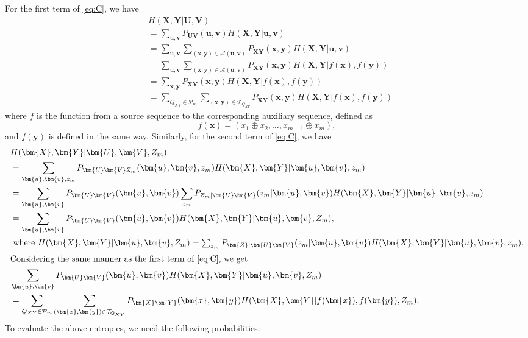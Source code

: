 \documentclass[journal,onecolumn]{IEEEtran}
\theoremstyle{definition}
\theoremstyle{remark}
\newcommand{\xm}{\bm{x}}
\newcommand{\ym}{\bm{y}}
\newcommand{\um}{\bm{u}}
\newcommand{\vm}{\bm{v}}
\newcommand{\Xm}{\bm{X}}
\newcommand{\Ym}{\bm{Y}}
\newcommand{\Um}{\bm{U}}
\newcommand{\Vm}{\bm{V}}
\newcommand{\Zm}{\bm{Z}}
\begin{document}
    For the first term of \eqref{eq:C}, we have
    \begin{align*}
        &H(\Xm,\Ym|\Um,\Vm)\\
        &= \sum_{ \um , \vm } P_{\Um\Vm}( \um , \vm ) H(\Xm,\Ym| \um , \vm )\\
        &= \sum_{ \um , \vm } \sum_{( \xm , \ym )\in \mathcal{A}( \um , \vm )} P_{\Xm\Ym}( \xm , \ym ) H(\Xm,\Ym| \um , \vm ) \\
        &= \sum_{ \um , \vm } \sum_{( \xm , \ym )\in \mathcal{A}( \um , \vm )} P_{\Xm\Ym}( \xm , \ym ) H(\Xm,\Ym| f ( \xm ), f ( \ym ))\\
        &= \sum_{ \xm , \ym }P_{\Xm\Ym}( \xm , \ym ) H(\Xm,\Ym| f ( \xm ), f ( \ym ))\\
        &= \sum_{Q_{XY}\in \mathcal{P}_m} \sum_{( \xm , \ym )\in \mathcal{T}_{Q_{XY}} } P_{\Xm\Ym}( \xm , \ym )H(\Xm,\Ym| f ( \xm ), f ( \ym ))
    \end{align*}
    where $f$ is the function from a source sequence to the corresponding auxiliary sequence, defined as
    \begin{equation*}
        f(\xm)
        =
        (x_1\oplus x_2,\ldots,x_{m-1}\oplus x_m),
    \end{equation*}
    and \(f(\ym)\) is defined in the same way.
    Similarly, for the second term of \eqref{eq:C}, we have
    \begin{align*}
        &H(\Xm,\Ym|\Um,\Vm,Z_m)\\
        &= \sum_{ \um , \vm ,z_m} P_{\Um\Vm Z_m}( \um , \vm ,z_m) H(\Xm,\Ym| \um , \vm ,z_m)\\
        &= \sum_{ \um , \vm } P_{\Um\Vm}( \um , \vm ) \sum_{z_m} P_{Z_m|\Um\Vm}(z_m| \um , \vm ) H(\Xm,\Ym| \um , \vm ,z_m)\\
        &= \sum_{ \um , \vm } P_{\Um\Vm}( \um , \vm ) H(\Xm,\Ym| \um , \vm ,Z_m),\\
        \intertext{    where $H(\Xm,\Ym| \um , \vm ,Z_m)=\sum_{z_m} P_{\Zm|\Um\Vm}(z_m| \um , \vm ) H(\Xm,\Ym| \um , \vm ,z_m)$.}
        \intertext{Considering the same manner as the first term of \eqref{eq:C}, we get}
        &\sum_{ \um , \vm } P_{\Um\Vm}( \um , \vm ) H(\Xm,\Ym| \um , \vm ,Z_m)\\
        &= \sum_{Q_{XY}\in \mathcal{P}_m} \sum_{( \xm , \ym )\in \mathcal{T}_{Q_{XY}} } P_{\Xm\Ym}( \xm , \ym )H(\Xm,\Ym| f ( \xm ), f ( \ym ),Z_m).
    \end{align*}
    To evaluate the above entropies, we need the following probabilities:
\end{document}
